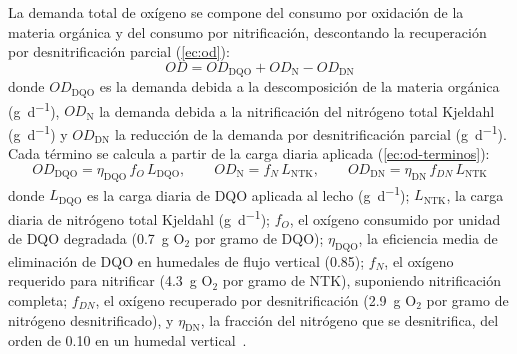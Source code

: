 La demanda total de oxígeno se compone del consumo por oxidación de la materia orgánica y del consumo por nitrificación, descontando la recuperación por desnitrificación parcial (\cref{ec:od}):
\begin{equation}
  OD = OD_{\mathrm{DQO}} + OD_{\mathrm{N}} - OD_{\mathrm{DN}}
  \label{ec:od}
\end{equation}
donde $OD_{\mathrm{DQO}}$ es la demanda debida a la descomposición de la materia orgánica (\unit{\gram\per\day}), $OD_{\mathrm{N}}$ la demanda debida a la nitrificación del nitrógeno total Kjeldahl (\unit{\gram\per\day}) y $OD_{\mathrm{DN}}$ la reducción de la demanda por desnitrificación parcial (\unit{\gram\per\day}).
Cada término se calcula a partir de la carga diaria aplicada (\cref{ec:od-terminos}):
\begin{equation}
  OD_{\mathrm{DQO}} = \eta_{\mathrm{DQO}}\, f_{O}\, L_{\mathrm{DQO}}, \qquad OD_{\mathrm{N}} = f_{N}\, L_{\mathrm{NTK}}, \qquad OD_{\mathrm{DN}} = \eta_{\mathrm{DN}}\, f_{DN}\, L_{\mathrm{NTK}}
  \label{ec:od-terminos}
\end{equation}
donde $L_{\mathrm{DQO}}$ es la carga diaria de DQO aplicada al lecho (\unit{\gram\per\day}); $L_{\mathrm{NTK}}$, la carga diaria de nitrógeno total Kjeldahl (\unit{\gram\per\day}); $f_{O}$, el oxígeno consumido por unidad de DQO degradada (\qty{0.7}{\gram} O$_2$ por gramo de DQO); $\eta_{\mathrm{DQO}}$, la eficiencia media de eliminación de DQO en humedales de flujo vertical (\num{0.85}); $f_{N}$, el oxígeno requerido para nitrificar (\qty{4.3}{\gram} O$_2$ por gramo de NTK), suponiendo nitrificación completa; $f_{DN}$, el oxígeno recuperado por desnitrificación (\qty{2.9}{\gram} O$_2$ por gramo de nitrógeno desnitrificado), y $\eta_{\mathrm{DN}}$, la fracción del nitrógeno que se desnitrifica, del orden de \num{0.10} en un humedal vertical~\parencite{platzer1999design,dotro2021humedales}.

